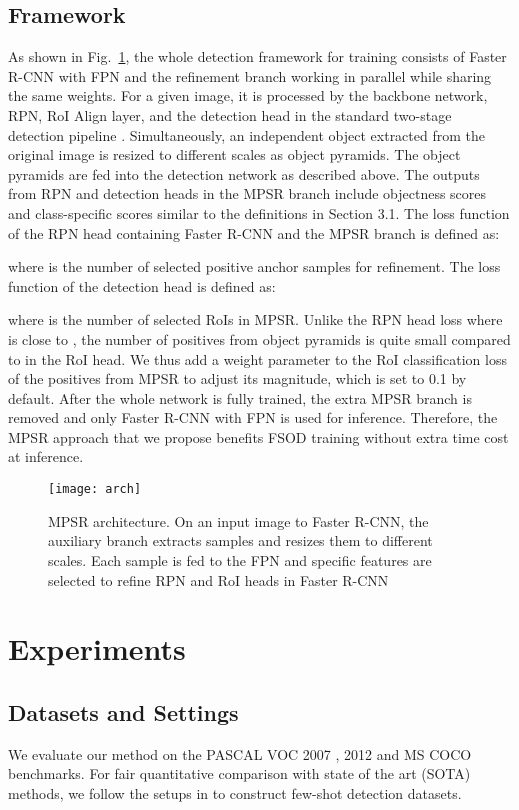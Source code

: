 \documentclass[runningheads]{llncs}
\begin{document}
\subsection{Framework}
As shown in Fig.~\ref{fig:arch}, the whole detection framework for training consists of Faster R-CNN with FPN and the refinement branch working in parallel while sharing the same weights.
For a given image, it is processed by the backbone network, RPN, RoI Align layer, and the detection head in the standard two-stage detection pipeline \cite{fasterrcnn}. 
Simultaneously, an independent object extracted from the original image is resized to different scales as object pyramids. 
The object pyramids are fed into the detection network as described above. 
The outputs from RPN and detection heads in the MPSR branch include objectness scores and class-specific scores similar to the definitions in Section 3.1.
The loss function of the RPN head containing Faster R-CNN and the MPSR branch is defined as:

where  is the number of selected positive anchor samples for refinement. The loss function of the detection head is defined as:

where  is the number of selected RoIs in MPSR. 
Unlike the RPN head loss where  is close to , the number of positives from object pyramids is quite small compared to  in the RoI head.
We thus add a weight parameter  to the RoI classification loss of the positives from MPSR to adjust its magnitude, which is set to 0.1 by default.
After the whole network is fully trained, the extra MPSR branch is removed and only Faster R-CNN with FPN is used for inference. 
Therefore, the MPSR approach that we propose benefits FSOD training without extra time cost at inference.
\begin{figure}
	\centering
	\texttt{[image: arch]}
	\caption{MPSR architecture. On an input image to Faster R-CNN, the auxiliary branch extracts samples and resizes them to different scales. Each sample is fed to the FPN and specific features are selected to refine RPN and RoI heads in Faster R-CNN}
	\label{fig:arch}
\end{figure} 

\section{Experiments}

\subsection{Datasets and Settings}
We evaluate our method on the PASCAL VOC 2007 \cite{voc07}, 2012 \cite{voc12} and MS COCO \cite{coco} benchmarks. 
For fair quantitative comparison with state of the art (SOTA) methods, we follow the setups in \cite{yolore,metarcnn} to construct few-shot detection datasets.
\end{document}
